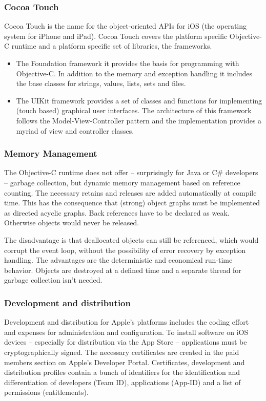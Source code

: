 \subsubsection{Cocoa Touch}
\label{sec:Cocoa}

Cocoa Touch is the name for the object-oriented APIs for iOS (the operating system for iPhone and iPad). 
Cocoa Touch covers the platform specific Objective-C runtime and a platform specific set of libraries, the frameworks.

\begin{itemize}
\item The Foundation framework it provides the basis for programming with Objective-C. 
In addition to the memory and exception handling it includes the base classes for strings, values, lists, sets and files.
\item The UIKit framework provides a set of classes and functions for implementing (touch based) graphical user interfaces. 
The architecture of this framework follows the Model-View-Controller pattern 
and the implementation provides a myriad of view and controller classes.
\end{itemize}

\subsubsection{Memory Management}
\label{sec:MemoryManagement}
The Objective-C runtime does not offer – surprisingly for Java or C\# developers  – garbage collection, 
but dynamic memory management based on reference counting. 
The necessary retains and releases are added automatically at compile time.
This has the consequence that (strong) object graphs must be implemented as directed acyclic graphs. 
Back references have to be declared as weak.
Otherwise objects would never be released. 

The disadvantage is that deallocated objects can still be referenced, which would corrupt the event loop,
without the possibility of error recovery by exception handling.
The advantages are the deterministic and economical run-time behavior.
Objects are destroyed at a defined time and a separate thread for garbage collection isn't needed. 



\subsubsection{Development and distribution}
\label{sec:DAD}
Development and distribution for Apple's platforms includes the coding effort and expenses for administration and configuration. 
To install software on iOS devices – especially for distribution via the App Store – applications must be cryptographically signed. 
The necessary certificates are created in the paid members section on Apple's Developer Portal. 
Certificates, development and distribution profiles contain a bunch of identifiers for the identification and differentiation of developers (Team ID), 
applications (App-ID) and a list of permissions (entitlements). 


